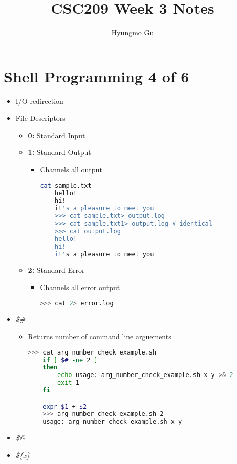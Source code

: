 \documentclass[12pt]{article}
\begin{document}
\title{CSC209 Week 3 Notes}
\author{Hyungmo Gu}
\maketitle

\section*{Shell Programming 4 of 6}

\bigskip

\begin{itemize}
    \item I/O redirection
    \item File Descriptors
    \begin{itemize}
    \item \textbf{0:} Standard Input
    \item \textbf{1:} Standard Output
    \begin{itemize}
    \item Channels all output

    \begin{lstlisting}[language=bash]
    cat sample.txt
    hello!
    hi!
    it's a pleasure to meet you
    >>> cat sample.txt> output.log
    >>> cat sample.txt1> output.log # identical
    >>> cat output.log
    hello!
    hi!
    it's a pleasure to meet you
    \end{lstlisting}
    \end{itemize}

    \item \textbf{2:} Standard Error
    \begin{itemize}
    \item Channels all error output

    \begin{lstlisting}[language=bash]
    >>> cat 2> error.log
    \end{lstlisting}
    \end{itemize}

    \end{itemize}
    \item \textit{\$\#}
    \begin{itemize}
    \item Returns number of command line arguements

    \begin{lstlisting}[language=bash]
    >>> cat arg_number_check_example.sh
    if [ $# -ne 2 ]
    then
        echo usage: arg_number_check_example.sh x y >& 2
        exit 1
    fi

    expr $1 + $2
    >>> arg_number_check_example.sh 2
    usage: arg_number_check_example.sh x y
    \end{lstlisting}

    \end{itemize}
    \item \textit{\$@}
    \item \textit{\$\{x\}}
\end{itemize}
\end{document}
